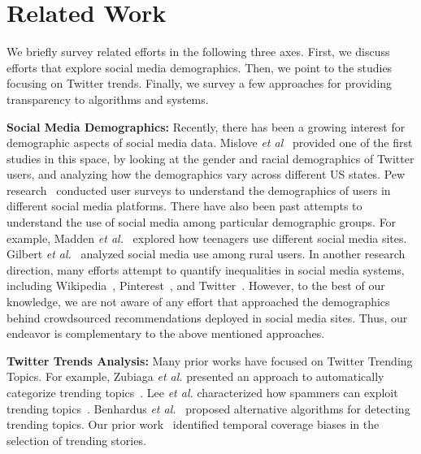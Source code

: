 \documentclass[letterpaper]{article}
\begin{document}
\section{Related Work}
\label{sec:related}
\noindent
We briefly survey related efforts in the following three axes. First, we discuss efforts that explore social media demographics. Then, we point to the studies focusing on Twitter trends. Finally, we survey a few approaches for %
providing transparency to algorithms and systems.

\vspace{1mm}
\noindent \textbf{Social Media Demographics: }
Recently, there has been a growing interest for demographic aspects of social media data.
Mislove {\it et al}~\cite{mislove2011understanding} provided one of the first studies 
in this space, by looking at the gender and racial demographics
of Twitter users, and analyzing how the demographics vary across different US states.
Pew research~\cite{pew_demography} conducted user surveys to understand the demographics
of users in different social media platforms. There have also been past attempts to understand
the use of social media among particular demographic groups. For example, Madden {\it et al.}~\cite{madden2013teens}
explored how teenagers use different social media sites. Gilbert {\it et al.}~\cite{gilbert2008network}
analyzed social media use among rural users.
In another research direction, many efforts attempt to quantify inequalities in social media systems, including Wikipedia~\cite{wagner2016women}, 
Pinterest~\cite{Gilbert:2013:INT:2470654.2481336}, and Twitter~\cite{nilizadeh2016twitter}.
However, to the best of our knowledge, we are not aware of any effort that approached the demographics
behind crowdsourced recommendations deployed in social media sites.
Thus, our endeavor is complementary to the above mentioned approaches.

\vspace{1mm}
\noindent \textbf{Twitter Trends Analysis:}
Many prior works have focused on 
Twitter Trending Topics. 
For example, Zubiaga \textit{et al.} presented an approach to automatically categorize trending topics~\cite{zubiaga2011classifying}.
Lee \textit{et al.} characterized how spammers can exploit trending topics~\cite{lee2012detecting}.
Benhardus \textit{et al.}~\cite{benhardus2013streaming} proposed alternative algorithms for detecting trending topics.
Our prior work~\cite{chakraborty2015can} identified temporal coverage biases in the selection of trending stories.
\end{document}
